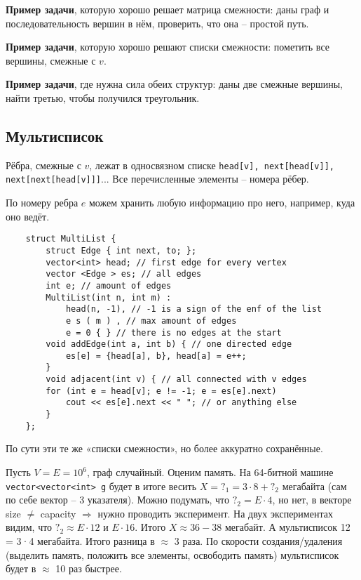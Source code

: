 \textbf{Пример задачи}, которую хорошо решает матрица смежности: даны граф и последовательность вершин в нём, проверить, что она – простой путь.

\textbf{Пример задачи}, которую хорошо решают списки смежности: пометить все вершины, смежные с $v$.

\textbf{Пример задачи}, где нужна сила обеих структур: даны две смежные вершины, найти третью, чтобы получился треугольник.

\subsection*{Мультисписок}
Рёбра, смежные с $v$, лежат в односвязном списке \lstinline!head[v], next[head[v]], next[next[head[v]]]!... Все перечисленные элементы – номера рёбер.

По номеру ребра $e$ можем хранить любую информацию про него, например, куда оно ведёт.

\begin{lstlisting}
    struct MultiList {
        struct Edge { int next, to; };
        vector<int> head; // first edge for every vertex
        vector <Edge > es; // all edges
        int e; // amount of edges
        MultiList(int n, int m) :
            head(n, -1), // -1 is a sign of the enf of the list
            e s ( m ) , // max amount of edges
            e = 0 { } // there is no edges at the start
        void addEdge(int a, int b) { // one directed edge
            es[e] = {head[a], b}, head[a] = e++;
        }
        void adjacent(int v) { // all connected with v edges
        for (int e = head[v]; e != -1; e = es[e].next)
            cout << es[e].next << " "; // or anything else
        }
    };
\end{lstlisting}

По сути эти те же «списки смежности», но более аккуратно сохранённые.

Пусть $V=E=10^6$, граф случайный. Оценим память.
На 64-битной машине \lstinline!vector<vector<int> g! будет в итоге весить $X = ?_1 = 3 \cdot 8 + ?_2$ мегабайта (сам по себе вектор – 3 указателя). Можно подумать, что $?_2 = E \cdot 4$, но нет, в векторе size $\neq$ capacity $\Rightarrow$ нужно проводить эксперимент. На двух экспериментах видим, что $?_2 \approx E \cdot 12$ и $E\cdot 16$. Итого $X\approx 36-38$  мегабайт.
А мультисписок 12 = 3·4 мегабайта. Итого разница в $\approx$ 3 раза. По скорости создания/удаления (выделить память, положить все элементы, освободить память) мультисписок будет в $\approx$ 10 раз быстрее.

